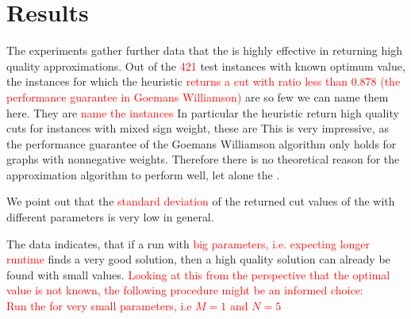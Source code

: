 \documentclass[12pt,a4paper]{article}
\theoremstyle{mythm}
\begin{document}
\section{Results} 
The experiments gather further data that the \BH is highly effective in returning high quality approximations.
Out of the \textcolor{red}{421} test instances with known optimum value, the instances for which the heuristic \textcolor{red}{returns a cut with ratio less than 0.878 (the
performance guarantee in Goemans Williamson) } are so few we can name them here. They are
\textcolor{red}{name the instances}
In particular the heuristic return high quality cuts for instances with mixed sign weight, these are
This is very impressive, as the performance guarantee of the Goemans Williamson algorithm only holds for graphs with nonnegative weights. Therefore there is no theoretical
reason for the approximation algorithm to perform well, let alone the \BH.

We point out that the \textcolor{red}{standard deviation} of the returned cut values of the \BH with different parameters is very low in general.

The data indicates, that if a run with \textcolor{red}{big parameters, i.e. expecting longer runtime} finds a very good solution, then a high quality solution can already be
found with small values.
\textcolor{red}{
Looking at this from the perspective that the optimal value is not known, the following procedure might be an informed choice: \\
Run the \BH for very small parameters, i.e $ M = 1 $ and $ N = 5 $
}


\listoftodos[Notes]
\end{document}
